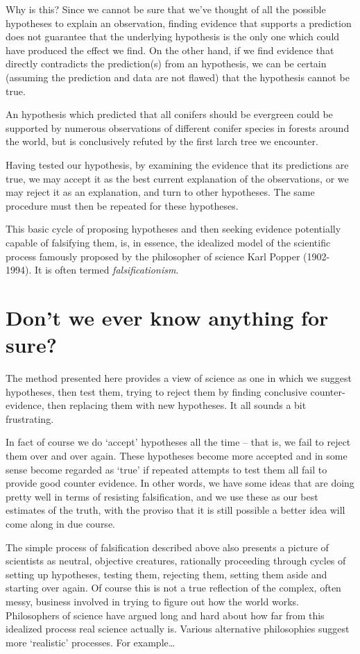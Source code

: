\documentclass[
]{book}
\begin{document}
Why is this? Since we cannot be sure that we've thought of all the possible hypotheses to explain an observation, finding evidence that supports a prediction does not guarantee that the underlying hypothesis is the only one which could have produced the effect we find. On the other hand, if we find evidence that directly contradicts the prediction(s) from an hypothesis, we can be certain (assuming the prediction and data are not flawed) that the hypothesis cannot be true.

An hypothesis which predicted that all conifers should be evergreen could be supported by numerous observations of different conifer species in forests around the world, but is conclusively refuted by the first larch tree we encounter.

Having tested our hypothesis, by examining the evidence that its predictions are true, we may accept it as the best current explanation of the observations, or we may reject it as an explanation, and turn to other hypotheses. The same procedure must then be repeated for these hypotheses.

This basic cycle of proposing hypotheses and then seeking evidence potentially capable of falsifying them, is, in essence, the idealized model of the scientific process famously proposed by the philosopher of science Karl Popper (1902-1994). It is often termed \emph{falsificationism}.

\hypertarget{are-we-sure}{%
\section{Don't we ever know anything for sure?}\label{are-we-sure}}

The method presented here provides a view of science as one in which we suggest hypotheses, then test them, trying to reject them by finding conclusive counter-evidence, then replacing them with new hypotheses. It all sounds a bit frustrating.

In fact of course we do `accept' hypotheses all the time -- that is, we fail to reject them over and over again. These hypotheses become more accepted and in some sense become regarded as `true' if repeated attempts to test them all fail to provide good counter evidence. In other words, we have some ideas that are doing pretty well in terms of resisting falsification, and we use these as our best estimates of the truth, with the proviso that it is still possible a better idea will come along in due course.

The simple process of falsification described above also presents a picture of scientists as neutral, objective creatures, rationally proceeding through cycles of setting up hypotheses, testing them, rejecting them, setting them aside and starting over again. Of course this is not a true reflection of the complex, often messy, business involved in trying to figure out how the world works. Philosophers of science have argued long and hard about how far from this idealized process real science actually is. Various alternative philosophies suggest more `realistic' processes. For example\ldots{}
\end{document}
